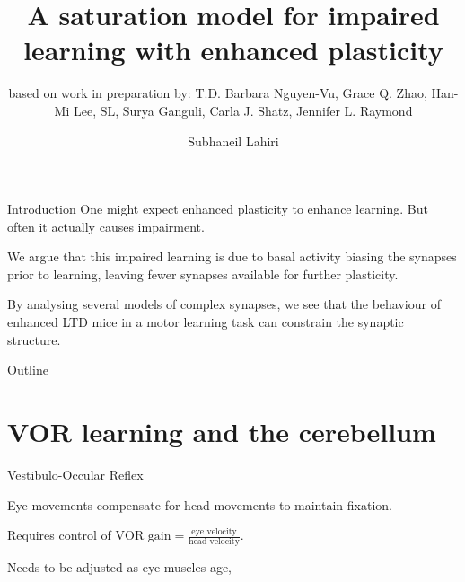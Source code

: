 \documentclass{beamer}%
\title[Saturation by enh. plasticity impairs learning]{A saturation model for impaired learning with enhanced plasticity}
\subtitle{\small{based on work in preparation by: T.D. Barbara Nguyen-Vu, Grace Q. Zhao, Han-Mi Lee, SL, Surya Ganguli, Carla J. Shatz, Jennifer L. Raymond
}}
\author{Subhaneil Lahiri%
}
\institute[Stanford]{%
Stanford University, Applied Physics
}
\begin{document}

\begin{frame}
%
 \titlepage
%
\end{frame}


\begin{frame}{Introduction}
%
 One might expect enhanced plasticity to enhance learning.
 But often it actually causes impairment.

 \vp We argue that this impaired learning is due to basal activity biasing the synapses prior to learning, leaving fewer synapses available for further plasticity.

 \vp By analysing several models of complex synapses, we see that the behaviour of enhanced LTD mice in a motor learning task can constrain the synaptic structure.
%
\end{frame}


\begin{frame}{Outline}
%
 \tableofcontents[hideallsubsections]
%
\end{frame}



\section{VOR learning and the cerebellum}


\begin{frame}{Vestibulo-Occular Reflex}
%
 \parbox[t]{0.4\linewidth}{}
 \parbox[t]{0.59\linewidth}{%
 Eye movements compensate for head movements to maintain fixation.

 \vp Requires control of $\text{VOR gain} = \frac{\text{eye velocity}}{\text{head velocity}}$.

 \vp Needs to be adjusted as eye muscles age, \etc
 }

%
\end{frame}
\end{document}
